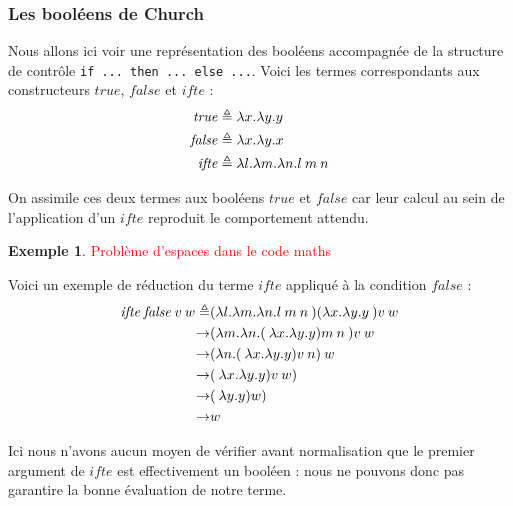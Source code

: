 \documentclass {article}
\theoremstyle{definition}
\newtheorem{example}{Exemple}
\theoremstyle{remark}
\newcommand{\todo}[1]{\textcolor{red}{#1}}
\begin{document}
\subsubsection{Les booléens de Church}
\label{church-bool}

\newcommand{\True}{\ensuremath{\mathit{true}}}
\newcommand{\False}{\ensuremath{\mathit{false}}}
\newcommand{\Ifte}{\ensuremath{\mathit{ifte}}}

Nous allons ici voir une représentation des booléens accompagnée de la 
structure de contrôle \texttt{if ... then ... else ...}.
Voici les termes correspondants aux constructeurs \True{}, \False{} et 
\Ifte{} :
\begin{align*}
  \True &\triangleq  \Lam{x}{\Lam{y}{\Var{y}}} \\
  \False &\triangleq \Lam{x}{\Lam{y}{\Var{x}}} \\
  \Ifte &\triangleq \Lam{l}{\Lam{m}{\Lam{n}{\App{\Var{l}}{\App{\Var{m}}{\Var{n}}}}}}  \\
\end{align*}

On assimile ces deux termes aux booléens \True{} et \False{} car leur calcul au sein
de l'application d'un \Ifte{} reproduit le comportement attendu.

\begin{example}
  \todo{Problème d'espaces dans le code maths}

  Voici un exemple de réduction du terme \Ifte{} appliqué à la condition \False{} :
  \begin{align*}
    \App{\App{\App{\Ifte}{\False}}{\Var{v}}}{\Var{w}}  \triangleq& \App{\App{\App{(\Lam{l}{\Lam{m}{\Lam{n}{\App{\App{l}{m}}{n}}}}})({\Lam{x}{\Lam{y}{y}}}}){v}}{w} \\
    \rightarrow & \App{\App{({\Lam{m}{\Lam{n}{\App{\App({\Lam{x}{\Lam{y}{y}}}){m}}{n}}}}}){v}}{w} \\
    \rightarrow & \App{(\Lam{n}{\App{\App({\Lam{x}{\Lam{y}{y}}}){v}}{n}})}{w} \\
    \rightarrow & \App{\App({\Lam{x}{\Lam{y}{y}}}){v}}{w}) \\
    \rightarrow & \App({\Lam{y}{y}}){w}) \\
    \rightarrow & \Var{w}
  \end{align*}
\end{example}

Ici nous n'avons aucun moyen de vérifier avant normalisation que le
premier argument de \Ifte{} est effectivement un booléen : nous ne
pouvons donc pas garantire la bonne évaluation de notre terme.
\end{document}

